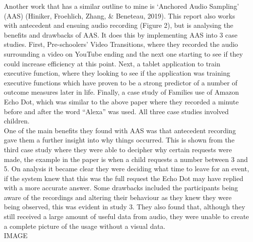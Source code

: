 \documentclass[a4paper,11pt]{report}
\begin{document}
Another work that has a similar outline to mine is ‘Anchored Audio Sampling’ (AAS) (Hiniker, Froehlich, Zhang, \& Beneteau, 2019). This report also works with antecedent and ensuing audio recording (Figure 2), but is analysing the benefits and drawbacks of AAS. It does this by implementing AAS into 3 case studies. First, Pre-schoolers’ Video Transitions, where they recorded the audio surrounding a video on YouTube ending and the next one starting to see if they could increase efficiency at this point. Next, a tablet application to train executive function, where they looking to see if the application was training executive functions which have proven to be a strong predictor of a number of outcome measures later in life. Finally, a case study of Families use of Amazon Echo Dot, which was similar to the above paper where they recorded a minute before and after the word “Alexa” was used. All three case studies involved children. \\

One of the main benefits they found with AAS was that antecedent recording gave them a further insight into why things occurred. This is shown from the third case study where they were able to decipher why certain requests were made, the example in the paper is when a child requests a number between 3 and 5. On analysis it became clear they were deciding what time to leave for an event, if the system knew that this was the full request the Echo Dot may have replied with a more accurate answer. Some drawbacks included the participants being aware of the recordings and altering their behaviour as they knew they were being observed, this was evident in study 3. They also found that, although they still received a large amount of useful data from audio, they were unable to create a complete picture of the usage without a visual data.\\

	IMAGE\\
\end{document}
